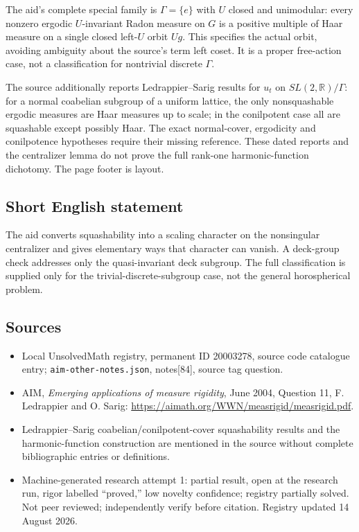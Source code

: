 \documentclass[11pt]{article}
\newcommand{\R}{\mathbb{R}}
\begin{document}
The aid's complete special family is $\Gamma=\{e\}$ with $U$ closed and unimodular: every nonzero ergodic $U$-invariant Radon measure on $G$ is a positive multiple of Haar measure on a single closed left-$U$ orbit $Ug$. This specifies the actual orbit, avoiding ambiguity about the source's term left coset. It is a proper free-action case, not a classification for nontrivial discrete $\Gamma$.

The source additionally reports Ledrappier--Sarig results for $u_t$ on $SL(2,\R)/\Gamma$: for a normal coabelian subgroup of a uniform lattice, the only nonsquashable ergodic measures are Haar measures up to scale; in the conilpotent case all are squashable except possibly Haar. The exact normal-cover, ergodicity and conilpotence hypotheses require their missing reference. These dated reports and the centralizer lemma do not prove the full rank-one harmonic-function dichotomy. The page footer is layout.
\subsection{Short English statement}
The aid converts squashability into a scaling character on the nonsingular centralizer and gives elementary ways that character can vanish. A deck-group check addresses only the quasi-invariant deck subgroup. The full classification is supplied only for the trivial-discrete-subgroup case, not the general horospherical problem.
\subsection{Sources}
\begin{itemize}
\item Local UnsolvedMath registry, permanent ID 20003278, source code catalogue entry; \texttt{aim-other-notes.json}, notes[84], source tag question.
\item AIM, \emph{Emerging applications of measure rigidity}, June 2004, Question 11, F. Ledrappier and O. Sarig: \url{https://aimath.org/WWN/measrigid/measrigid.pdf}.
\item Ledrappier--Sarig coabelian/conilpotent-cover squashability results and the harmonic-function construction are mentioned in the source without complete bibliographic entries or definitions.
\item Machine-generated research attempt 1: partial result, open at the research run, rigor labelled ``proved,'' low novelty confidence; registry partially solved. Not peer reviewed; independently verify before citation. Registry updated 14 August 2026.
\end{itemize}
\end{document}
